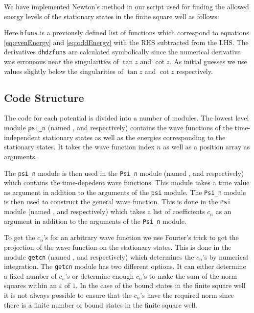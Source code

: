 \documentclass[12pt,a4paper]{article}
\renewcommand{\epsilon}{\varepsilon}
\begin{document}
We have implemented Newton's method in our script used for finding the allowed energy levels of the stationary states in the finite square well as follows:

Here \lstinline{hfuns} is a previously defined list of functions which correspond to equations \eqref{eq:evenEnergy} and \eqref{eq:oddEnergy} with the RHS subtracted from the LHS. The derivatives \lstinline{dhdzfuns} are calculated symbolically since the numerical derivative was erroneous near the singularities of $\tan z$ and $\cot z$. As initial guesses we use values slightly below the singularities of $\tan z$ and $\cot z$ respectively.

\subsection{Code Structure}
The code for each potential is divided into a number of modules. The lowest level module \verb!psi_n! (named ,  and  respectively) contains the wave functions of the time-independent stationary states as well as the energies corresponding to the stationary states. It takes the wave function index $n$ as well as a position array as arguments.

The \verb!psi_n! module is then used in the \verb!Psi_n! module (named ,  and  respectively) which contains the time-depedent wave functions. This module takes a time value as argument in addition to the arguments of the \verb!psi! module.  The \verb!Psi_n! module is then used to construct the general wave function. This is done in the \verb!Psi! module (named ,  and  respectively) which takes a list of coefficients $c_n$ as an argument in addition to the arguments of the \verb!Psi_n! module.

To get the $c_n$'s for an arbitrary wave function we use Fourier's trick to get the projection of the wave function on the stationary states. This is done in the module \verb!getcn! (named ,  and  respectively) which determines the $c_n$'s by numerical integration. The \verb!getcn! module has two different options. It can either determine a fixed number of $c_n$'s or determine enough $c_n$'s to make the sum of the norm squares within an $\epsilon$ of $1$. In the case of the bound states in the finite square well it is not always possible to ensure that the $c_n$'s have the required norm since there is a finite number of bound states in the finite square well.
\end{document}
